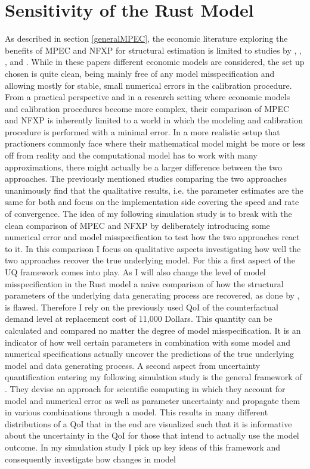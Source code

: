 \section{Sensitivity of the Rust Model} \label{sensitivity}
\thispagestyle{plain} %

As described in section \ref{generalMPEC}, the economic literature exploring the benefits of MPEC and NFXP for structural estimation is limited to studies by \cite{Su.Judd.2012}, \cite{Dube.Fox.Su.2012}, \cite{Jorgensen.2013}, \cite{Iskhakov.2016} and \cite{Dong.Hsieh.Zhang.2017}. While in these papers different economic models are considered, the set up chosen is quite clean, being mainly free of any model misspecification and allowing mostly for stable, small numerical errors in the calibration procedure. From a practical perspective and in a research setting where economic models and calibration procedures become more complex, their comparison of MPEC and NFXP is inherently limited to a world in which the modeling and calibration procedure is performed with a minimal error. In a more realistic setup that practioners commonly face where their mathematical model might be more or less off from reality and the computational model has to work with many approximations, there might actually be a larger difference between the two approaches. The previously mentioned studies comparing the two approaches unanimously find that the qualitative results, i.e. the parameter estimates are the same for both and focus on the implementation side covering the speed and rate of convergence. The idea of my following simulation study is to break with the clean comparison of MPEC and NFXP by deliberately introducing some numerical error and model misspecification to test how the two approaches react to it. In this comparison I focus on qualitative aspects investigating how well the two approaches recover the true underlying model. For this a first aspect of the UQ framework comes into play. As I will also change the level of model misspecification in the Rust model a naive comparison of how the structural parameters of the underlying data generating process are recovered, as done by \cite{Su.Judd.2012}, is flawed. Therefore I rely on the previously used QoI of the counterfactual demand level at replacement cost of 11,000 Dollars. This quantity can be calculated and compared no matter the degree of model misspecification. It is an indicator of how well certain parameters in combination with some model and numerical specifications actually uncover the predictions of the true underlying model and data generating process. A second aspect from uncertainty quantification entering my following simulation study is the general framework of \cite{Oberkampf.2010}. They devise an approach for scientific computing in which they account for model and numerical error as well as parameter uncertainty and propagate them in various combinations through a model. This results in many different distributions of a QoI that in the end are visualized such that it is informative about the uncertainty in the QoI for those that intend to actually use the model outcome. In my simulation study I pick up key ideas of this framework and consequently investigate how changes in model 